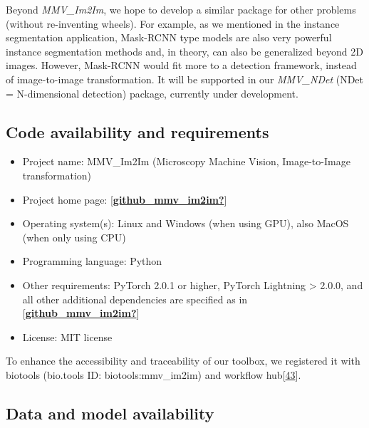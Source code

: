 Beyond \emph{MMV\_Im2Im}, we hope to develop a similar package for other problems (without re-inventing wheels). For example, as we mentioned in the instance segmentation application, Mask-RCNN type models are also very powerful instance segmentation methods and, in theory, can also be generalized beyond 2D images. However, Mask-RCNN would fit more to a detection framework, instead of image-to-image transformation. It will be supported in our \emph{MMV\_NDet} (NDet = N-dimensional detection) package, currently under development.

\hypertarget{code-availability-and-requirements}{%
\subsection{Code availability and requirements}\label{code-availability-and-requirements}}

\begin{itemize}
\item
  Project name: MMV\_Im2Im (Microscopy Machine Vision, Image-to-Image transformation)
\item
  Project home page: {[}\protect\hyperlink{ref-github_mmv_im2im}{\textbf{github\_mmv\_im2im?}}{]}
\item
  Operating system(s): Linux and Windows (when using GPU), also MacOS (when only using CPU)
\item
  Programming language: Python
\item
  Other requirements: PyTorch 2.0.1 or higher, PyTorch Lightning \textgreater{} 2.0.0, and all other additional dependencies are specified as in {[}\protect\hyperlink{ref-github_mmv_im2im}{\textbf{github\_mmv\_im2im?}}{]}
\item
  License: MIT license
\end{itemize}

To enhance the accessibility and traceability of our toolbox, we registered it with biotools (bio.tools ID: biotools:mmv\_im2im) and workflow hub{[}\protect\hyperlink{ref-xl7YzUeX}{43}{]}.

\hypertarget{data-and-model-availability}{%
\subsection{Data and model availability}\label{data-and-model-availability}}

